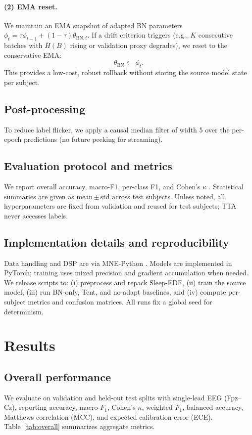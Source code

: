 \documentclass{article}
\begin{document}
\paragraph{(2) EMA reset.}
We maintain an EMA snapshot of adapted BN parameters $\phi_t = \tau \phi_{t-1} + (1{-}\tau)\theta_{\text{BN},t}$. If a drift criterion triggers (e.g., $K$ consecutive batches with $\overline{H}(B)$ rising or validation proxy degrades), we reset to the conservative EMA:
\[
\theta_{\text{BN}} \leftarrow \phi_t.
\]
This provides a low-cost, robust rollback without storing the source model state per subject.

\subsection{Post-processing}
To reduce label flicker, we apply a causal median filter of width 5 over the per-epoch predictions (no future peeking for streaming).

\subsection{Evaluation protocol and metrics}
We report overall accuracy, macro-F1, per-class F1, and Cohen’s $\kappa$ \citep{cohen1960kappa}. Statistical summaries are given as mean\,$\pm$\,std across test subjects. Unless noted, all hyperparameters are fixed from validation and reused for test subjects; TTA never accesses labels.

\subsection{Implementation details and reproducibility}
Data handling and DSP are via MNE‐Python \citep{gramfort2013mne,gramfort2014mne}. Models are implemented in PyTorch; training uses mixed precision and gradient accumulation when needed. We release scripts to: (i) preprocess and repack Sleep-EDF, (ii) train the source model, (iii) run BN-only, Tent, and no-adapt baselines, and (iv) compute per-subject metrics and confusion matrices. All runs fix a global seed for determinism. 


\section{Results}

\subsection{Overall performance}
We evaluate on validation and held-out test splits with single-lead EEG (Fpz--Cz), reporting accuracy, macro-\(F_1\), Cohen's \(\kappa\), weighted \(F_1\), balanced accuracy, Matthews correlation (MCC), and expected calibration error (ECE). Table~\ref{tab:overall} summarizes aggregate metrics.
\end{document}
